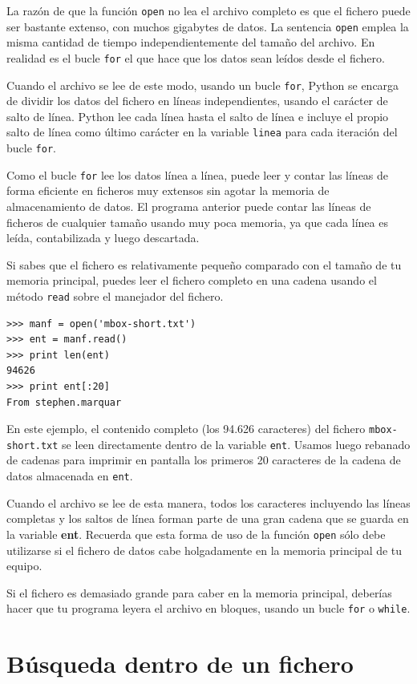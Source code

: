 La razón de que la función {\tt open} no lea el archivo completo
es que el fichero puede ser bastante extenso, con muchos gigabytes de datos.
La sentencia {\tt open} emplea la misma cantidad de tiempo independientemente del
tamaño del archivo. En realidad es el bucle {\tt for} el que hace que
los datos sean leídos desde el fichero.

Cuando el archivo se lee de este modo, usando un bucle {\tt for}, Python
se encarga de dividir los datos del fichero en líneas independientes, usando
el carácter de salto de línea. Python lee cada línea hasta el
salto de línea e incluye
el propio salto de línea como último carácter en la variable {\tt linea} para
cada iteración del bucle {\tt for}.

Como el bucle {\tt for} lee los datos línea a línea, puede
leer y contar las líneas de forma eficiente en ficheros muy extensos sin
agotar la memoria de almacenamiento de datos. El programa anterior puede
contar las líneas de ficheros de cualquier tamaño usando muy poca memoria,
ya que cada línea es leída, contabilizada y luego descartada.

Si sabes que el fichero es relativamente pequeño comparado con el tamaño de
tu memoria principal, puedes leer el fichero completo en una cadena
usando el método {\tt read} sobre el manejador del fichero.

\beforeverb
\begin{verbatim}
>>> manf = open('mbox-short.txt')
>>> ent = manf.read()
>>> print len(ent)
94626
>>> print ent[:20]
From stephen.marquar
\end{verbatim}
\afterverb
%
En este ejemplo, el contenido completo (los 94.626 caracteres)
del fichero {\tt mbox-short.txt} se leen directamente dentro de la variable
{\tt ent}. Usamos luego rebanado de cadenas para imprimir en pantalla
los primeros 20 caracteres de la cadena de datos almacenada en {\tt ent}.

Cuando el archivo se lee de esta manera, todos los caracteres incluyendo
las líneas completas y los saltos de línea forman parte de una gran cadena
que se guarda en la variable {\bf ent}.
Recuerda que esta forma de uso de la función {\tt open} sólo debe utilizarse
si el fichero de datos cabe holgadamente en la memoria principal
de tu equipo.

Si el fichero es demasiado grande para caber en la memoria principal, deberías
hacer que tu programa leyera el archivo en bloques, usando un bucle
{\tt for} o {\tt while}.

\section{Búsqueda dentro de un fichero}

